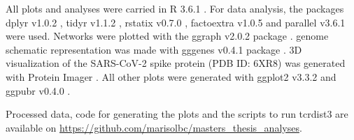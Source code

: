 All plots and analyses were carried in R 3.6.1 \citep{r}. For data analysis, the packages dplyr v1.0.2 \citep{dplyr}, tidyr v1.1.2 \citep{tidyr}, rstatix v0.7.0 \citep{rstatix}, factoextra v1.0.5 \citep{factoextra} and parallel v3.6.1 \citep{r} were used. Networks were plotted with the ggraph v2.0.2 package \citep{ggraph}. \covid{} genome schematic representation was made with gggenes v0.4.1 package \citep{gggenes}. 3D visualization of the SARS-CoV-2 spike protein (PDB ID: 6XR8) was generated with Protein Imager \citep{proteinimager}. All other plots were generated with ggplot2 v3.3.2 \citep{ggplot2} and ggpubr v0.4.0 \citep{ggpubr}.

Processed data, code for generating the plots and the scripts to run tcrdist3 are available on \url{https://github.com/marisolbc/masters_thesis_analyses}.


